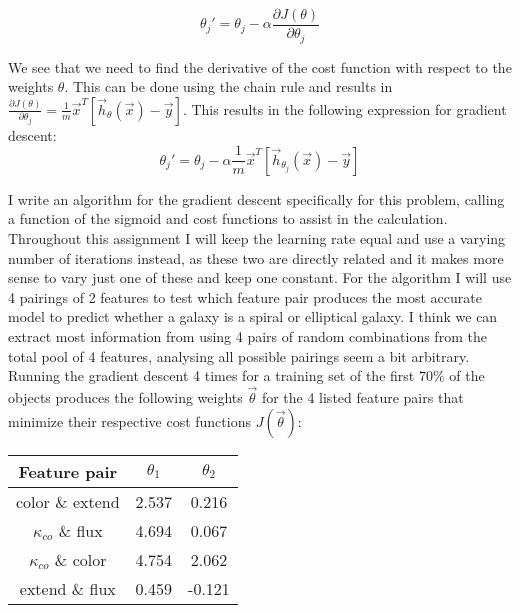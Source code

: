 \begin{equation}
\theta_{j}' = \theta_j - \alpha \frac{\partial J(\theta)}{\partial \theta_j}
\end{equation}

We see that we need to find the derivative of the cost function with respect to the weights $\theta$. This can be done using the chain rule and results in $\frac{\partial J(\theta)}{\partial \theta_j} = \frac{1}{m} \vec{x}^T [\vec{h}_{\theta}(\vec{x}) - \vec{y}]$. This results in the following expression for gradient descent:\\

\begin{equation}
\theta_{j}' = \theta_j - \alpha \frac{1}{m} \vec{x}^T [\vec{h}_{\theta_j}(\vec{x}) - \vec{y}]
\end{equation}

I write an algorithm for the gradient descent specifically for this problem, calling a function of the sigmoid and cost functions to assist in the calculation. Throughout this assignment I will keep the learning rate equal and use a varying number of iterations instead, as these two are directly related and it makes more sense to vary just one of these and keep one constant. For the algorithm I will use 4 pairings of 2 features to test which feature pair produces the most accurate model to predict whether a galaxy is a spiral or elliptical galaxy. I think we can extract most information from using 4 pairs of random combinations from the total pool of 4 features, analysing all possible pairings seem a bit arbitrary. Running the gradient descent 4 times for a training set of the first $70\%$ of the objects produces the following weights $\vec{\theta}$ for the 4 listed feature pairs that minimize their respective cost functions $J(\vec{\theta})$:

\begin{table}[!h]
\centering
\begin{tabular}{c|c|c}
\textbf{Feature pair} & $\theta_1$ & $\theta_2$\\ \hline 
color \& extend &   2.537       &     0.216\\ \hline 
$\kappa_{co}$ \& flux &     4.694      &      0.067\\ \hline 
$\kappa_{co}$ \& color &     4.754      &     2.062\\ \hline
extend \& flux &     0.459     &      -0.121
\end{tabular}
\end{table}

